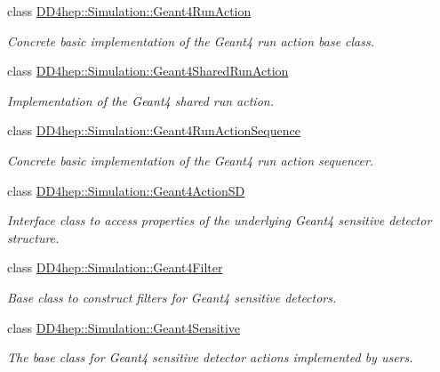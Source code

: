 \begin{DoxyCompactItemize}
class \hyperlink{class_d_d4hep_1_1_simulation_1_1_geant4_run_action}{DD4hep::Simulation::Geant4RunAction}
\begin{DoxyCompactList}\small\item\em Concrete basic implementation of the Geant4 run action base class. \item\end{DoxyCompactList}\item 
class \hyperlink{class_d_d4hep_1_1_simulation_1_1_geant4_shared_run_action}{DD4hep::Simulation::Geant4SharedRunAction}
\begin{DoxyCompactList}\small\item\em Implementation of the Geant4 shared run action. \item\end{DoxyCompactList}\item 
class \hyperlink{class_d_d4hep_1_1_simulation_1_1_geant4_run_action_sequence}{DD4hep::Simulation::Geant4RunActionSequence}
\begin{DoxyCompactList}\small\item\em Concrete basic implementation of the Geant4 run action sequencer. \item\end{DoxyCompactList}\item 
class \hyperlink{class_d_d4hep_1_1_simulation_1_1_geant4_action_s_d}{DD4hep::Simulation::Geant4ActionSD}
\begin{DoxyCompactList}\small\item\em Interface class to access properties of the underlying Geant4 sensitive detector structure. \item\end{DoxyCompactList}\item 
class \hyperlink{class_d_d4hep_1_1_simulation_1_1_geant4_filter}{DD4hep::Simulation::Geant4Filter}
\begin{DoxyCompactList}\small\item\em Base class to construct filters for Geant4 sensitive detectors. \item\end{DoxyCompactList}\item 
class \hyperlink{class_d_d4hep_1_1_simulation_1_1_geant4_sensitive}{DD4hep::Simulation::Geant4Sensitive}
\begin{DoxyCompactList}\small\item\em The base class for Geant4 sensitive detector actions implemented by users. \item\end{DoxyCompactList}\item 

\end{DoxyCompactItemize}
